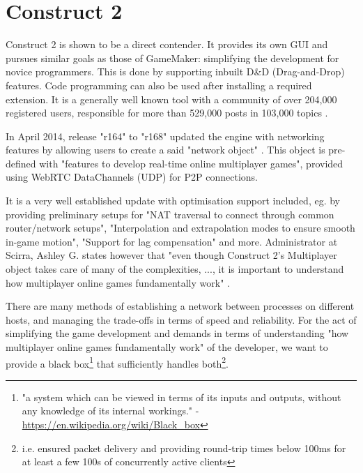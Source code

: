 \documentclass[bsc, 12pt, twoside, singlespacing, parskip, abbrevs, notimes, normalheadings, logo, deptreport]{styles/infthesis}
\begin{document}
\section{Construct 2}
Construct 2 is shown to be a direct contender. It provides its own GUI and pursues similar goals as those of GameMaker: simplifying the development for novice programmers. This is done by supporting inbuilt D\&D (Drag-and-Drop) features. Code programming can also be used after installing a required extension. It is a generally well known tool with a community of over 204,000 registered users, responsible for more than 529,000 posts in 103,000 topics \cite{scirra_forum}.

\vspace{1em}
In April 2014, release "r164" to "r168" updated the engine with networking features by allowing users to create a said "network object" \cite{construct2_multiplayer}. This object is pre-defined with "features to develop real-time online multiplayer games", provided using WebRTC DataChannels (UDP) for P2P connections. 

\vspace{1em}
It is a very well established update with optimisation support included, eg. by providing preliminary setups for "NAT traversal to connect through common router/network setups", "Interpolation and extrapolation modes to ensure smooth in-game motion", "Support for lag compensation" and more. Administrator at Scirra, Ashley G. states however that "even though Construct 2's Multiplayer object takes care of many of the complexities, ..., it is important to understand how multiplayer online games fundamentally work" \cite{Construct2_Multiplayer_Tutorial}. 

\vspace{1em}
There are many methods of establishing a network between processes on different hosts, and managing the trade-offs in terms of speed and reliability. For the act of simplifying the game development and demands in terms of understanding "how multiplayer online games fundamentally work" of the developer, we want to provide a black box\footnote{"a system which can be viewed in terms of its inputs and outputs, without any knowledge of its internal workings." - \url{https://en.wikipedia.org/wiki/Black\_box}} that sufficiently handles both\footnote{i.e. ensured packet delivery and providing round-trip times below 100ms for at least a few 100s of concurrently active clients}.

\end{document}
